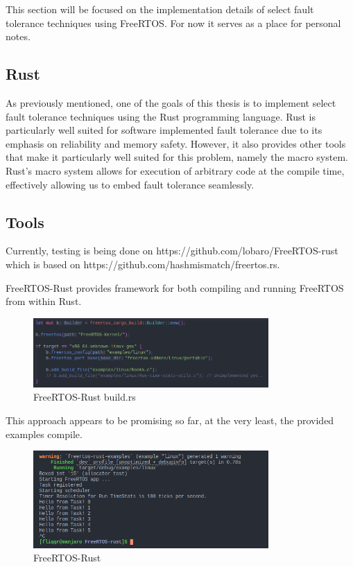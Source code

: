 \documentclass[12pt, letterpaper]{article}
\begin{document}
This section will be focused on the implementation details of select fault tolerance techniques using FreeRTOS. For now it serves as a place for personal notes.

\subsection{Rust}

As previously mentioned, one of the goals of this thesis is to implement select fault tolerance techniques using the Rust programming language. Rust is particularly well suited for software implemented fault tolerance due to its emphasis on reliability and memory safety. However, it also provides other tools that make it particularly well suited for this problem, namely the macro system. Rust's macro system allows for execution of arbitrary code at the compile time, effectively allowing us to embed fault tolerance seamlessly.

\subsection{Tools}

Currently, testing is being done on https://github.com/lobaro/FreeRTOS-rust which is based on https://github.com/hashmismatch/freertos.rs.

FreeRTOS-Rust provides framework for both compiling and running FreeRTOS from within Rust. 

\begin{figure}[hbt]
    \centering
    \includegraphics[width=0.8\textwidth]{diagrams/screenshots/freertos-rust-build.png}
    \caption{FreeRTOS-Rust build.rs}
    \label{fig:freertos-rust-build}
\end{figure}


This approach appears to be promising so far, at the very least, the provided examples compile.
\begin{figure}[hbt]
    \centering
    \includegraphics[width=0.8\textwidth]{diagrams/screenshots/freertos-rust-example.png}
    \caption{FreeRTOS-Rust}
    \label{fig:freertos-rust}
\end{figure}
\end{document}
